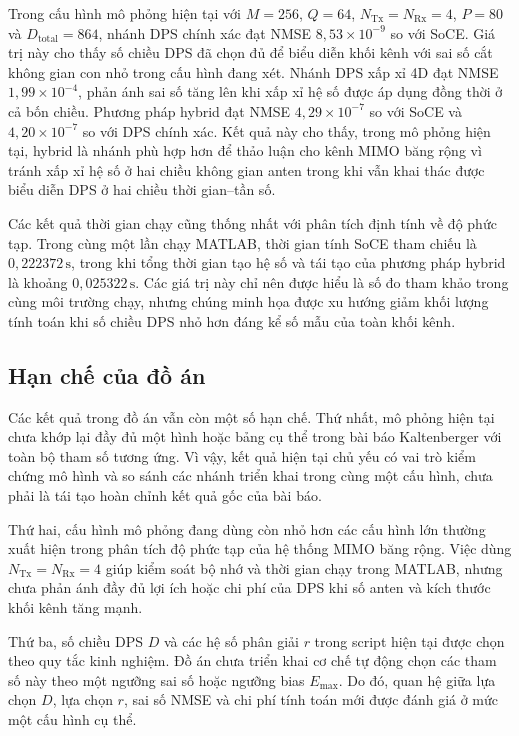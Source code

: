 Trong cấu hình mô phỏng hiện tại với \(M=256\), \(Q=64\), \(N_{\mathrm{Tx}}=N_{\mathrm{Rx}}=4\), \(P=80\) và \(D_{\mathrm{total}}=864\), nhánh DPS chính xác đạt NMSE \(8{,}53\times10^{-9}\) so với SoCE. Giá trị này cho thấy số chiều DPS đã chọn đủ để biểu diễn khối kênh với sai số cắt không gian con nhỏ trong cấu hình đang xét. Nhánh DPS xấp xỉ 4D đạt NMSE \(1{,}99\times10^{-4}\), phản ánh sai số tăng lên khi xấp xỉ hệ số được áp dụng đồng thời ở cả bốn chiều. Phương pháp hybrid đạt NMSE \(4{,}29\times10^{-7}\) so với SoCE và \(4{,}20\times10^{-7}\) so với DPS chính xác. Kết quả này cho thấy, trong mô phỏng hiện tại, hybrid là nhánh phù hợp hơn để thảo luận cho kênh MIMO băng rộng vì tránh xấp xỉ hệ số ở hai chiều không gian anten trong khi vẫn khai thác được biểu diễn DPS ở hai chiều thời gian--tần số.

Các kết quả thời gian chạy cũng thống nhất với phân tích định tính về độ phức tạp. Trong cùng một lần chạy MATLAB, thời gian tính SoCE tham chiếu là \(0{,}222372\,\mathrm{s}\), trong khi tổng thời gian tạo hệ số và tái tạo của phương pháp hybrid là khoảng \(0{,}025322\,\mathrm{s}\). Các giá trị này chỉ nên được hiểu là số đo tham khảo trong cùng môi trường chạy, nhưng chúng minh họa được xu hướng giảm khối lượng tính toán khi số chiều DPS nhỏ hơn đáng kể số mẫu của toàn khối kênh.

\subsection{Hạn chế của đồ án}
\label{subsec:ch5_limitations}

Các kết quả trong đồ án vẫn còn một số hạn chế. Thứ nhất, mô phỏng hiện tại chưa khớp lại đầy đủ một hình hoặc bảng cụ thể trong bài báo Kaltenberger với toàn bộ tham số tương ứng. Vì vậy, kết quả hiện tại chủ yếu có vai trò kiểm chứng mô hình và so sánh các nhánh triển khai trong cùng một cấu hình, chưa phải là tái tạo hoàn chỉnh kết quả gốc của bài báo.

Thứ hai, cấu hình mô phỏng đang dùng còn nhỏ hơn các cấu hình lớn thường xuất hiện trong phân tích độ phức tạp của hệ thống MIMO băng rộng. Việc dùng \(N_{\mathrm{Tx}}=N_{\mathrm{Rx}}=4\) giúp kiểm soát bộ nhớ và thời gian chạy trong MATLAB, nhưng chưa phản ánh đầy đủ lợi ích hoặc chi phí của DPS khi số anten và kích thước khối kênh tăng mạnh.

Thứ ba, số chiều DPS \(D\) và các hệ số phân giải \(r\) trong script hiện tại được chọn theo quy tắc kinh nghiệm. Đồ án chưa triển khai cơ chế tự động chọn các tham số này theo một ngưỡng sai số hoặc ngưỡng bias \(E_{\max}\). Do đó, quan hệ giữa lựa chọn \(D\), lựa chọn \(r\), sai số NMSE và chi phí tính toán mới được đánh giá ở mức một cấu hình cụ thể.

